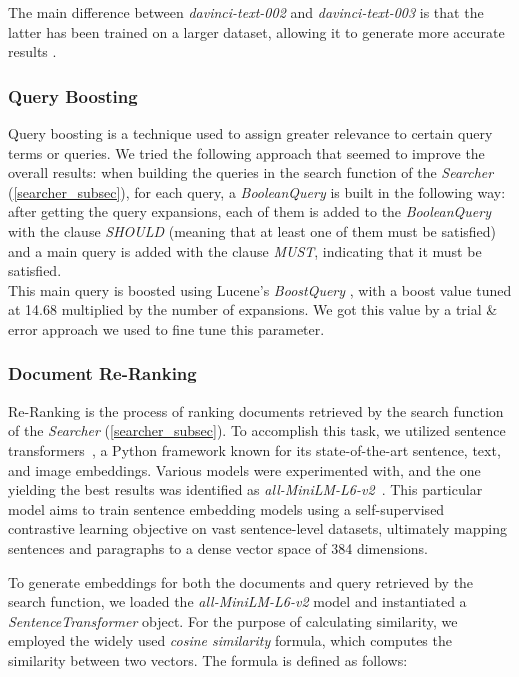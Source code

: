 The main difference between \textit{davinci-text-002} and \textit{davinci-text-003} is that the latter has been trained on a larger dataset, allowing it to generate more accurate results \cite{davincicomparison}.


\enlargethispage{2\baselineskip}
\subsubsection{Query Boosting}
Query boosting is a technique used to assign greater relevance to certain query terms or queries.\newline
We tried the following approach that seemed to improve the overall results: when building the queries in the search function of the \textit{Searcher} (\ref{searcher_subsec}), for each query, a \textit{BooleanQuery} \cite{lucenebooleanquery} is built in the following way: 
after getting the query expansions, each of them is added to the \textit{BooleanQuery} with the clause \textit{SHOULD} (meaning that at least one of them must be satisfied) and a main query is added with the clause \textit{MUST}, indicating that it must be satisfied. \\
This main query is boosted using Lucene's \textit{BoostQuery} \cite{luceneboostquery}, with a boost value tuned at 14.68 multiplied by the number of expansions. We got this value by a trial \& error approach we used to fine tune this parameter.

\subsubsection{Document Re-Ranking}
Re-Ranking is the process of ranking documents retrieved by the search function of the \textit{Searcher} (\ref{searcher_subsec}). 
To accomplish this task, we utilized sentence transformers~\cite{sentence-transformers}, a Python framework known for its state-of-the-art sentence, text, and image embeddings. 
Various models were experimented with, and the one yielding the best results was identified as \textit{all-MiniLM-L6-v2}~\cite{huggingfaceallminilml6v2}. 
This particular model aims to train sentence embedding models using a self-supervised contrastive learning objective on vast sentence-level datasets, ultimately mapping sentences and paragraphs to a dense vector space of 384 dimensions.

To generate embeddings for both the documents and query retrieved by the search function, we loaded the \textit{all-MiniLM-L6-v2} model and instantiated a \textit{SentenceTransformer} object. 
For the purpose of calculating similarity, we employed the widely used \textit{cosine similarity} formula, which computes the similarity between two vectors. The formula is defined as follows:

